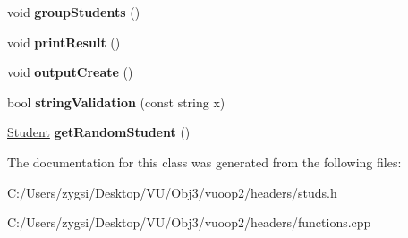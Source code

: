 \begin{DoxyCompactItemize}
\item 
\mbox{\label{class_studs_a737b6f06df19e763f6a818856ee734a3}} 
void {\bfseries group\+Students} ()
\item 
\mbox{\label{class_studs_a62eeab17983c8ab0d8462b0a6f22c301}} 
void {\bfseries print\+Result} ()
\item 
\mbox{\label{class_studs_ab92e02f2ffd4f1c80802c11d482a1e74}} 
void {\bfseries output\+Create} ()
\item 
\mbox{\label{class_studs_ad36bd20b6c2a1a3be07c3f479f06535f}} 
bool {\bfseries string\+Validation} (const string x)
\item 
\mbox{\label{class_studs_a2ef26c6c36c6377ade614156cd8aab57}} 
\mbox{\hyperlink{class_student}{Student}} {\bfseries get\+Random\+Student} ()
\end{DoxyCompactItemize}


The documentation for this class was generated from the following files\+:\begin{DoxyCompactItemize}
\item 
C\+:/\+Users/zygsi/\+Desktop/\+V\+U/\+Obj3/vuoop2/headers/studs.\+h\item 
C\+:/\+Users/zygsi/\+Desktop/\+V\+U/\+Obj3/vuoop2/headers/functions.\+cpp\end{DoxyCompactItemize}
